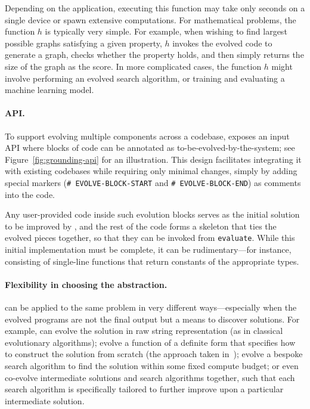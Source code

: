 Depending on the application, executing this function may take only seconds on a single device or spawn extensive computations. For mathematical problems, the function $h$ is typically very simple.
For example, when wishing to find largest possible graphs satisfying a given property, $h$ invokes the evolved code to generate a graph, checks whether the property holds, and then simply returns the size of the graph as the score.
In more complicated cases, the function $h$ might involve performing an evolved search algorithm, or training and evaluating a machine learning model.

\paragraph{API.} To support evolving multiple components across a codebase, \method exposes an input API where blocks of code can be annotated as to-be-evolved-by-the-system; see Figure~\ref{fig:grounding-api} for an illustration. This design facilitates integrating it with existing codebases while requiring only minimal changes, simply by adding special markers (\texttt{\# EVOLVE-BLOCK-START} and \texttt{\# EVOLVE-BLOCK-END}) as comments into the code.

Any user-provided code inside such evolution blocks serves as the initial solution to be improved by \method, and the rest of the code forms a skeleton that ties the evolved pieces together, so that they can be invoked from \texttt{evaluate}. 
While this initial implementation must be complete, it can be rudimentary---for instance, consisting of single-line functions that return constants of the appropriate types.



\paragraph{Flexibility in choosing the abstraction.} \method can be applied to the same problem in very different ways---especially when the evolved programs are not the final output but a means to discover solutions.
For example, \method can evolve the solution in raw string representation (as in classical evolutionary algorithms); evolve a function of a definite form that specifies how to construct the solution from scratch (the approach taken in~\cite{paredes2023mathematical}); evolve a bespoke search algorithm to find the solution within some fixed compute budget; or even co-evolve intermediate solutions and search algorithms together, such that each search algorithm is specifically tailored to further improve upon a particular intermediate solution.

